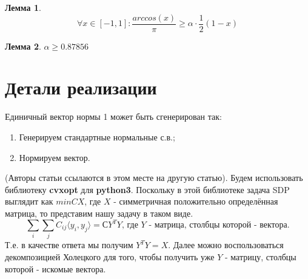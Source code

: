 \documentclass[12pt]{article}
\newtheorem{lemma}{Лемма}
\begin{document}
\begin{lemma}
$$
\forall x \in [-1, 1]: \frac{arccos(x)}{\pi} \geq \alpha \cdot \frac{1}{2} (1 - x)
$$
\end{lemma}
\begin{lemma}
$\alpha \geq 0.87856$
\end{lemma}

\section{Детали реализации}
Единичный вектор нормы 1 может быть сгенерирован так:
\begin{enumerate}
    \item Генерируем стандартные нормальные с.в.;
    \item Нормируем вектор.
\end{enumerate}
(Авторы статьи ссылаются в этом месте на другую статью).
Будем использовать библиотеку \textbf{cvxopt} для \textbf{python3}.
Поскольку в этой библиотеке задача SDP выглядит как $min CX$, где $X$ - симметричная положительно определённая матрица,
то представим нашу задачу в таком виде.
$$
\sum_i \sum_j C_{ij} \langle y_i, y_j \rangle = С Y^T Y \text{, где }Y\text{ - матрица, столбцы которой - вектора.}
$$
Т.е. в качестве ответа мы получим $Y^T Y = X$. Далее можно воспользоваться декомпозицией Холецкого для того, чтобы
получить уже  $Y$ - матрицу, столбцы которой - искомые вектора.
\end{document}
